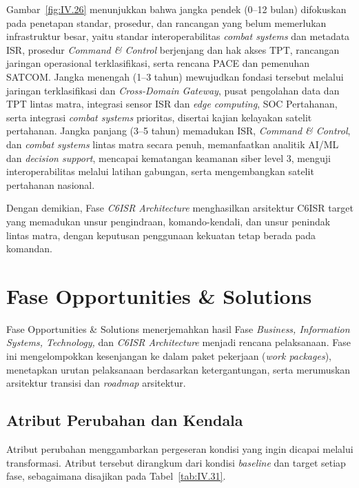 Gambar~\ref{fig:IV.26} menunjukkan bahwa jangka pendek (0–12 bulan) difokuskan pada penetapan standar, prosedur, dan rancangan yang belum memerlukan infrastruktur besar, yaitu standar interoperabilitas \textit{combat systems} dan metadata ISR, prosedur \textit{Command \& Control} berjenjang dan hak akses TPT, rancangan jaringan operasional terklasifikasi, serta rencana PACE dan pemenuhan SATCOM. Jangka menengah (1–3 tahun) mewujudkan fondasi tersebut melalui jaringan terklasifikasi dan \textit{Cross-Domain Gateway}, pusat pengolahan data dan TPT lintas matra, integrasi sensor ISR dan \textit{edge computing}, SOC Pertahanan, serta integrasi \textit{combat systems} prioritas, disertai kajian kelayakan satelit pertahanan. Jangka panjang (3–5 tahun) memadukan ISR, \textit{Command \& Control}, dan \textit{combat systems} lintas matra secara penuh, memanfaatkan analitik AI/ML dan \textit{decision support}, mencapai kematangan keamanan siber level 3, menguji interoperabilitas melalui latihan gabungan, serta mengembangkan satelit pertahanan nasional.

Dengan demikian, Fase \textit{C6ISR Architecture} menghasilkan arsitektur C6ISR target yang memadukan unsur pengindraan, komando-kendali, dan unsur penindak lintas matra, dengan keputusan penggunaan kekuatan tetap berada pada komandan.

\section{Fase Opportunities \& Solutions}
\label{sec:IV.7}

Fase Opportunities \& Solutions menerjemahkan hasil Fase \textit{Business, Information Systems, Technology,} dan \textit{C6ISR Architecture} menjadi rencana pelaksanaan. Fase ini mengelompokkan kesenjangan ke dalam paket pekerjaan (\textit{work packages}), menetapkan urutan pelaksanaan berdasarkan ketergantungan, serta merumuskan arsitektur transisi dan \textit{roadmap} arsitektur.

\subsection{Atribut Perubahan dan Kendala}
\label{sec:IV.7.1}

Atribut perubahan menggambarkan pergeseran kondisi yang ingin dicapai melalui transformasi. Atribut tersebut dirangkum dari kondisi \textit{baseline} dan target setiap fase, sebagaimana disajikan pada Tabel~\ref{tab:IV.31}.

